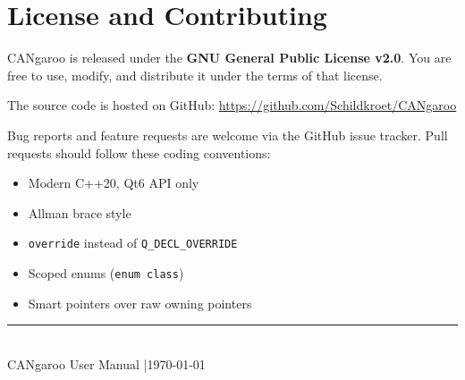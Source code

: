 \documentclass[a4paper,11pt]{article}
\begin{document}
\section{License and Contributing}

CANgaroo is released under the \textbf{GNU General Public License v2.0}.
You are free to use, modify, and distribute it under the terms of that license.

The source code is hosted on GitHub:
\url{https://github.com/Schildkroet/CANgaroo}

Bug reports and feature requests are welcome via the GitHub issue tracker.
Pull requests should follow these coding conventions:

\begin{itemize}
  \item Modern C++20, Qt6 API only
  \item Allman brace style
  \item \texttt{override} instead of \texttt{Q\_DECL\_OVERRIDE}
  \item Scoped enums (\texttt{enum class})
  \item Smart pointers over raw owning pointers
\end{itemize}

\vfill
\begin{center}
  \textcolor{canblue}{\rule{0.5\textwidth}{0.5pt}}\\[0.5em]
  {\small CANgaroo User Manual \quad|\quad \today}
\end{center}
\end{document}
